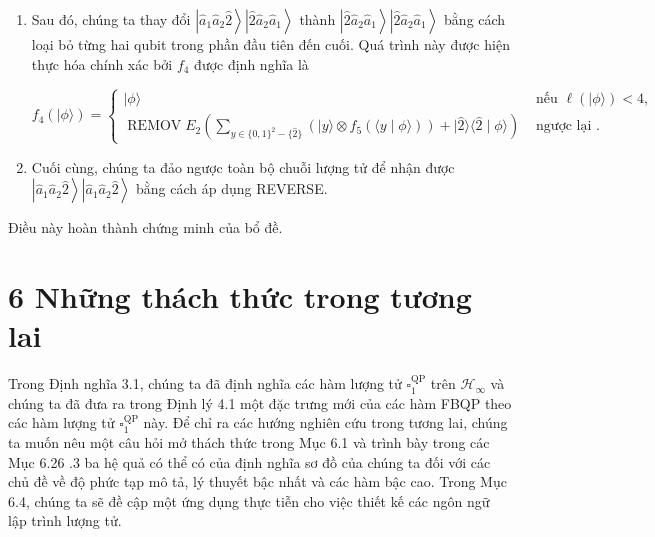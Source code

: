 \documentclass[10pt]{article}
\begin{document}
\begin{enumerate}
$$
f_{3}(|\phi\rangle)= \begin{cases}|\phi\rangle & \text { nếu } \ell(|\phi\rangle)<4, \\ R E M O V E_{2}\left(\sum_{y \in\{0,1\}^{4}-\{\hat{2} \hat{2}\}}|y\rangle \otimes f_{3}(\langle y \mid \phi\rangle)+|\hat{2} \hat{2}\rangle\langle\hat{2} \hat{2} \mid \phi\rangle\right) & \text { ngược lại. }\end{cases}
$$

  \item Sau đó, chúng ta thay đổi $\left|\hat{a}_{1} \hat{a}_{2} \hat{2}\right\rangle\left|\hat{2} \hat{a}_{2} \hat{a}_{1}\right\rangle$ thành $\left|\hat{2} \hat{a}_{2} \hat{a}_{1}\right\rangle\left|\hat{2} \hat{a}_{2} \hat{a}_{1}\right\rangle$ bằng cách loại bỏ từng hai qubit trong phần đầu tiên đến cuối. Quá trình này được hiện thực hóa chính xác bởi $f_{4}$ được định nghĩa là

$$
f_{4}(|\phi\rangle)= \begin{cases}|\phi\rangle & \text { nếu } \ell(|\phi\rangle)<4, \\ \operatorname{REMOV} E_{2}\left(\sum_{y \in\{0,1\}^{2}-\{\hat{2}\}}\left(|y\rangle \otimes f_{5}(\langle y \mid \phi\rangle)\right)+|\hat{2}\rangle\langle\hat{2} \mid \phi\rangle\right) & \text { ngược lại } .\end{cases}
$$

  \item Cuối cùng, chúng ta đảo ngược toàn bộ chuỗi lượng tử để nhận được $\left|\hat{a}_{1} \hat{a}_{2} \hat{2}\right\rangle\left|\hat{a}_{1} \hat{a}_{2} \hat{2}\right\rangle$ bằng cách áp dụng REVERSE.
\end{enumerate}

Điều này hoàn thành chứng minh của bổ đề.

\section*{6 Những thách thức trong tương lai}
Trong Định nghĩa 3.1, chúng ta đã định nghĩa các hàm lượng tử $\square_{1}^{\mathrm{QP}}$ trên $\mathcal{H}_{\infty}$ và chúng ta đã đưa ra trong Định lý 4.1 một đặc trưng mới của các hàm FBQP theo các hàm lượng tử $\square_{1}^{\mathrm{QP}}$ này. Để chỉ ra các hướng nghiên cứu trong tương lai, chúng ta muốn nêu một câu hỏi mở thách thức trong Mục 6.1 và trình bày trong các Mục 6.26 .3 ba hệ quả có thể có của định nghĩa sơ đồ của chúng ta đối với các chủ đề về độ phức tạp mô tả, lý thuyết bậc nhất và các hàm bậc cao. Trong Mục 6.4, chúng ta sẽ đề cập một ứng dụng thực tiễn cho việc thiết kế các ngôn ngữ lập trình lượng tử.
\end{document}
